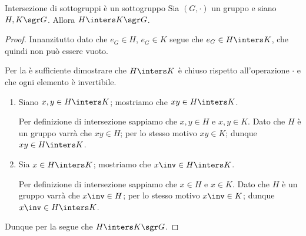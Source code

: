 \begin{proposition}
    {Intersezione di sottogruppi è un sottogruppo}{}
    Sia $(G, \cdot)$ un gruppo e siano $H, K \sgr G$.
    Allora $H \inters K \sgr G$.
\end{proposition}
\begin{proof}
    Innanzitutto dato che $e_G \in H$, $e_G \in K$ segue che $e_G \in H \inters K$, che quindi non può essere vuoto.

    Per la  è sufficiente dimostrare che $H \inters K$ è chiuso rispetto all'operazione $\cdot$ e che ogni elemento è invertibile.

    \begin{enumerate}[label={(\roman*)}]
        \item Siano $x, y \in H \inters K$; mostriamo che $xy \in H \inters K$.
        
        Per definizione di intersezione sappiamo che $x, y \in H$ e $x, y \in K$. Dato che $H$ è un gruppo varrà che $xy \in H$; per lo stesso motivo $xy \in K$; dunque $xy \in H \inters K$.

        \item Sia $x \in H \inters K$; mostriamo che $x\inv \in H \inters K$.
        
        Per definizione di intersezione sappiamo che $x \in H$ e $x \in K$. Dato che $H$ è un gruppo varrà che $x\inv \in H$; per lo stesso motivo $x\inv \in K$; dunque $x\inv \in H \inters K$.
    \end{enumerate}

    Dunque per la  segue che $H \inters K \sgr G$.
\end{proof}